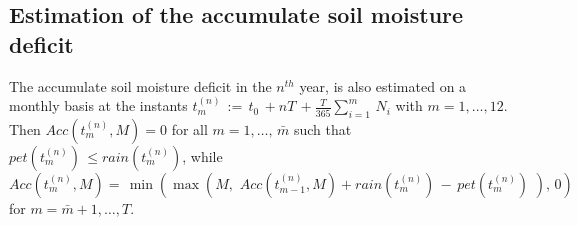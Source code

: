      \subsection{Estimation of the accumulate soil moisture deficit}
     The accumulate soil moisture deficit in the $n^{th}$ year, is also estimated on a  monthly basis at the instants  $t_{m}^{(n)}\,:=\, t_0\,+nT\,+ \displaystyle \frac{T}{365} \displaystyle \sum_{i=1}^{m}\, N_i$ with $m = 1,\dots, 12.$ 
     Then
      $Acc(t_{m}^{(n)},M)=0$ for all $m=1,\dots,\,\bar m$ 
such that $pet(t_{m}^{(n)})\,\leq  rain(t_{m}^{(n)})$, while
%  
$$
     Acc(t_{m}^{(n)},M) =\,  \min\left(\max\left(M,\, \,Acc(t_{m-1}^{(n)},M) + rain(t_{m}^{(n)}) \,-\,pet(t_{m}^{(n)})\,\,\right),\,0\right)
     $$
for  $m=\bar m +1,\dots,T$. %






